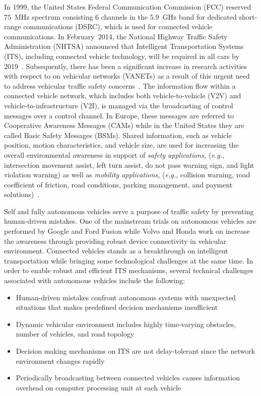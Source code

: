 \documentclass[journal, 11pt]{IEEEtran}
\begin{document}
In 1999, the United States Federal Communication Commission (FCC) reserved
$75$~MHz spectrum consisting 6 channels in the $5.9$~GHz band for dedicated
short-range communications (DSRC), which is used for connected vehicle
communications. In February~2014, the National Highway Traffic Safety
Administration (NHTSA) announced that Intelligent Transportation Systems (ITS),
including connected vehicle technology, will be required in all cars by
2019~\cite{factsheet}. Subsequently, there has been a significant increase in
research activities with respect to on vehicular networks (VANETs) as a result
of this urgent need to address vehicular traffic safety concerns~\cite{ntsb}.
The information flow within a connected vehicle network, which includes both
vehicle-to-vehicle (V2V) and vehicle-to-infrastructure (V2I), is managed via the
broadcasting of control messages over a control channel. In Europe, these
messages are referred to Cooperative Awareness Messages (CAMs) while in the
United States they are called Basic Safety Messages (BSMs). Shared information,
such as vehicle position, motion characteristics, and vehicle size, are used for
increasing the overall environmental awareness in support of \textit{safety
applications,} (\textit{e.g.,} intersection movement assist, left turn assist,
do not pass warning sign, and light violation warning) as well as
\textit{mobility applications,} (\textit{e.g.,} collision warning, road
coefficient of friction, road conditions, parking management, and payment
solutions)~\cite{hardingNHTSA14}.

Self and fully autonomous vehicles serve a purpose of traffic safety by
preventing human-driven mistakes. One of the mainstream trials on autonomous
vehicles are performed by Google and Ford Fusion while Volvo and Honda work on
increase the awareness through providing robust device connectivity in vehicular
environment. Connected vehicles stands as a breakthrough on intelligent
transportation while bringing some technological challenges at the same time. In
order to enable robust and efficient ITS mechanisms, several technical
challenges associated with autonomous vehicles include the following:

\begin{itemize}
\item Human-driven mistakes confront autonomous systems with unexpected
situations that makes predefined decision mechanisms insufficient
\item Dynamic vehicular environment includes highly time-varying obstacles,
number of vehicles, and road topology
\item Decision making mechanisms on ITS are not delay-tolerant since the network
environment changes rapidly
\item Periodically broadcasting between connected vehicles causes information
overhead on computer processing unit at each vehicle\\
\end{itemize}
\end{document}
